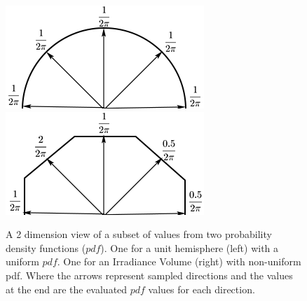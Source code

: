 \documentclass[ %
                    author={Callum Pearce},
                supervisor={Dr. Neill Campbell},
                    degree={MEng},
                     title={How effective are Temporal difference learning methods for reducing the number of zero contribution light paths, while still accurately approximating Global Illumination in Path tracing?},
                  subtitle={},
                      type={research},
                      year={2019} ]{dissertation}
\begin{document}
\begin{figure}[h]
\centering
{}
  \includegraphics[width=\textwidth]{images/uniform_pdf.png}   
  \label{fig:uniform_pdf}
\endminipage\hspace{5em}
  \includegraphics[width=\textwidth]{images/not_uniform_pdf.png}
  \label{fig:not_uniform_pdf}
\endminipage
\caption{A 2 dimension view of a subset of values from two probability density functions ($pdf$). One for a unit hemisphere (left) with a uniform $pdf$. One for an Irradiance Volume (right) with non-uniform pdf. Where the arrows represent sampled directions and the values at the end are the evaluated $pdf$ values for each direction.}
\label{fig:pdfs}
\end{figure}
\end{document}
